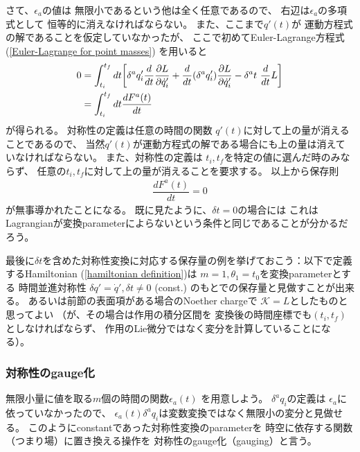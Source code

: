 さて、$\epsilon_a$の値は
無限小であるという他は全く任意であるので、
右辺は$\epsilon_a$の多項式として
恒等的に消えなければならない。
また、ここまで$q'(t)$が
運動方程式の解であることを仮定していなかったが、
ここで初めてEuler-Lagrange方程式
(\ref{Euler-Lagrange for point masses})
を用いると
\begin{align}
  0 &=
  \int_{t_i}^{t_f} dt
  \bigg[
    \delta^a q'_i
    \dfrac{d}{dt}
    \dfrac{\partial L}{\partial \dot{q}'_i}
  +
    \dfrac{d}{dt}
    (\delta^a q'_i)
    \dfrac{\partial L}{\partial \dot{q}'_i}
  -
    \delta^a t
    \ 
    \dfrac{d}{dt}
    L
  \bigg]
\notag\\&=
  \int_{t_i}^{t_f} dt
  \dfrac{dF^a(t)}{dt}
\end{align}
が得られる。
対称性の定義は任意の時間の関数
$q'(t)$に対して上の量が消えることであるので、
当然$q'(t)$が運動方程式の解である場合にも上の量は消えていなければならない。
また、対称性の定義は
$t_i, t_f$を特定の値に選んだ時のみならず、
任意の$t_i, t_f$に対して上の量が消えることを要求する。
以上から保存則
\begin{align}
  \dfrac{dF^a(t)}{dt} = 0
\end{align}
が無事導かれたことになる。
既に見たように、$\delta t = 0$の場合には
これはLagrangianが変換parameterによらないという条件と同じであることが分かるだろう。

最後に$\delta t$を含めた対称性変換に対応する保存量の例を挙げておこう：以下で定義するHamiltonian
(\ref{hamiltonian definition})は
$m=1, \theta_1 = t_0$を変換parameterとする
時間並進対称性
$\delta q' = \dot{q}', \delta t \neq 0$ (const.)
のもとでの保存量と見做すことが出来る。
あるいは前節の表面項がある場合のNoether chargeで
$\mathcal{K}=L$としたものと思ってよい
（が、その場合は作用の積分区間を
変換後の時間座標でも$(t_i, t_f)$としなければならず、
作用のLie微分ではなく変分を計算していることになる）。

\subsubsection{対称性のgauge化}

無限小量に値を取る$m$個の時間の関数$\epsilon_a (t)$
を用意しよう。
$\delta^a q_i$の定義は
$\epsilon_a$に依っていなかったので、
$\epsilon_a(t) \delta^a q_i$は変数変換ではなく無限小の変分と見做せる。
このようにconstantであった対称性変換のparameterを
時空に依存する関数（つまり場）に置き換える操作を
対称性のgauge化（gauging）と言う。

